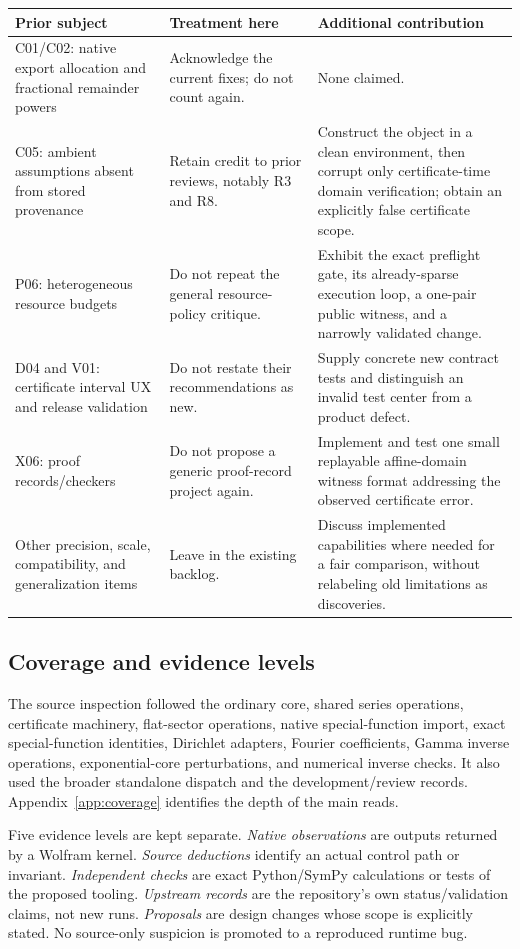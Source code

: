 \documentclass[11pt,a4paper]{article}
\begin{document}
\begin{longtable}{@{}P{0.23\textwidth}P{0.33\textwidth}P{0.36\textwidth}@{}}
\toprule Prior subject & Treatment here & Additional contribution\\\midrule\endhead
C01/C02: native export allocation and fractional remainder powers & Acknowledge the current fixes; do not count again. & None claimed.\\
C05: ambient assumptions absent from stored provenance & Retain credit to prior reviews, notably R3 and R8. & Construct the object in a clean environment, then corrupt only certificate-time domain verification; obtain an explicitly false certificate scope.\\
P06: heterogeneous resource budgets & Do not repeat the general resource-policy critique. & Exhibit the exact preflight gate, its already-sparse execution loop, a one-pair public witness, and a narrowly validated change.\\
D04 and V01: certificate interval UX and release validation & Do not restate their recommendations as new. & Supply concrete new contract tests and distinguish an invalid test center from a product defect.\\
X06: proof records/checkers & Do not propose a generic proof-record project again. & Implement and test one small replayable affine-domain witness format addressing the observed certificate error.\\
Other precision, scale, compatibility, and generalization items & Leave in the existing backlog. & Discuss implemented capabilities where needed for a fair comparison, without relabeling old limitations as discoveries.\\
\bottomrule
\end{longtable}

\subsection{Coverage and evidence levels}
The source inspection followed the ordinary core, shared series operations, certificate machinery, flat-sector operations, native special-function import, exact special-function identities, Dirichlet adapters, Fourier coefficients, Gamma inverse operations, exponential-core perturbations, and numerical inverse checks. It also used the broader standalone dispatch and the development/review records. Appendix~\ref{app:coverage} identifies the depth of the main reads.

Five evidence levels are kept separate. \emph{Native observations} are outputs returned by a Wolfram kernel. \emph{Source deductions} identify an actual control path or invariant. \emph{Independent checks} are exact Python/SymPy calculations or tests of the proposed tooling. \emph{Upstream records} are the repository's own status/validation claims, not new runs. \emph{Proposals} are design changes whose scope is explicitly stated. No source-only suspicion is promoted to a reproduced runtime bug.
\end{document}
